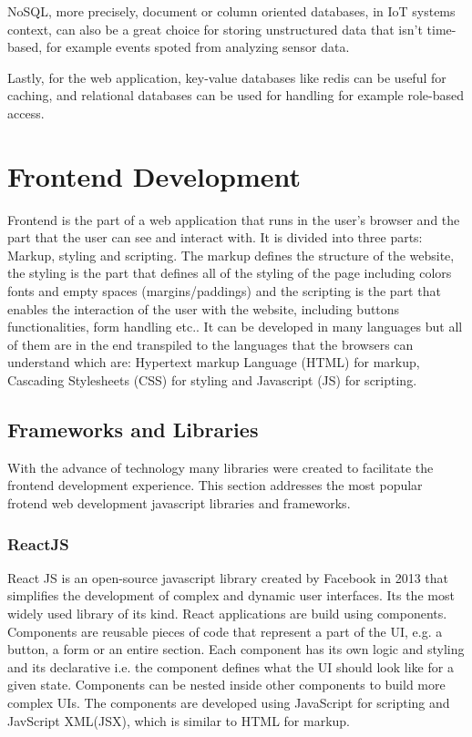NoSQL, more precisely, document or column oriented databases, in IoT systems
context, can also be a great choice for storing unstructured data that isn't
time-based, for example events spoted from analyzing sensor data.

Lastly, for the web application, key-value databases like redis can be useful
for caching, and relational databases can be used for handling for example
role-based access.

\section{Frontend Development}
Frontend is the part of a web application that runs in the user's browser and
the part that the user can see and interact with. It is divided into three
parts: Markup, styling and scripting.
The markup defines the structure of the website, the styling is the part that
defines all of the styling of the page including colors fonts and empty spaces
(margins/paddings) and the scripting is the part that enables the interaction
of the user with the website, including buttons functionalities, form handling
etc..
It can be developed in many languages but all of them are in the end transpiled
to the languages that the browsers can understand which are: Hypertext markup
Language (HTML) for markup, Cascading Stylesheets (CSS) for styling and
Javascript (JS) for scripting.

\subsection{Frameworks and Libraries}
With the advance of technology many libraries were created to facilitate the
frontend development experience. This section addresses the most popular
frotend web development javascript libraries and frameworks.
\subsubsection{ReactJS}
React JS is an open-source javascript library created by Facebook in 2013 that
simplifies the development of complex and dynamic user interfaces. Its the most widely
used library of its kind.
React applications are build using components. Components are reusable pieces of
code that represent a part of the UI, e.g. a button, a form or an entire section.
Each component has its own logic and styling and its declarative i.e. the
component defines what the UI should look like for a given state.
Components can be nested inside other components to build more complex UIs.
The components are developed using JavaScript for scripting and JavScript XML(JSX),
which is similar to HTML for markup.


